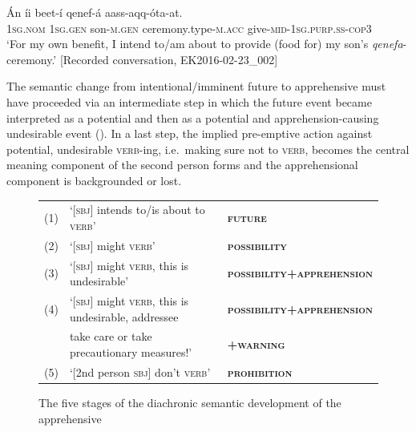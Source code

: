 \documentclass[output=paper,colorlinks,citecolor=brown,]{langscibook}
\begin{document}
\ea\label{ex:treis:33}
\gll Án			íi			beet-í			qenef-á aass-aqq-óta-at. \\
\textsc{1sg.nom} \textsc{1sg.gen}	son-\textsc{m.gen}	ceremony.type-\textsc{m.acc} give-\textsc{mid-1sg.purp.ss-cop3}\\
\glt `For my own benefit, I intend to/am about to provide (food for) my son's \textit{qenefa}-ceremony.' [Recorded conversation, EK2016-02-23\_002]
\z

The semantic change from intentional/imminent future to apprehensive must have proceeded via an intermediate step in which the future event became interpreted as a potential and then as a potential and apprehension-causing undesirable event (). In a last step, the implied pre-emptive action against potential, undesirable \textsc{verb}-ing,  i.e.\ making sure not to \textsc{verb}, becomes the central meaning component of the second person forms and the apprehensional component is backgrounded or lost. 

\begin{figure}[ht]
\small%
\begin{tabular}{@{} lll @{}} 
(1) & `[\textsc{sbj}] intends to/is about to \textsc{verb}'&\textbf{\textsc{future}}\\
(2) & `[\textsc{sbj}] might \textsc{verb}' & \textbf{\textsc{possibility}}\\
(3) & `[\textsc{sbj}] might \textsc{verb}, this is undesirable'&\textbf{\textsc{possibility+apprehension}}\\
(4) & `[\textsc{sbj}] might \textsc{verb}, this is undesirable, addressee & \textbf{\textsc{possibility+apprehension}}\\
& \hspace{.5cm} take care or take precautionary measures!' & \hspace{.5cm}\textbf{\textsc{+warning}}\\
(5) & `[2nd person \textsc{sbj}] don't \textsc{verb}' &  \textbf{\textsc{prohibition}}
\end{tabular}
\caption{The five stages of the diachronic semantic development of the apprehensive}
\label{fig:treis:6}
\end{figure}

\end{document}
